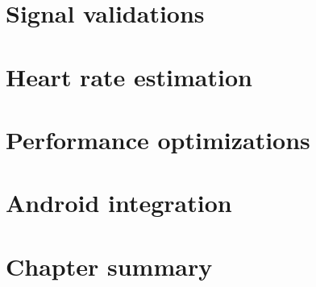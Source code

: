 
\section{Signal validations} \label{sec:impl:validations}


\section{Heart rate estimation} \label{sec:impl:estimation}


\section{Performance optimizations} \label{sec:impl:performance}


\section{Android integration} \label{sec:impl:android}



\section{Chapter summary}

